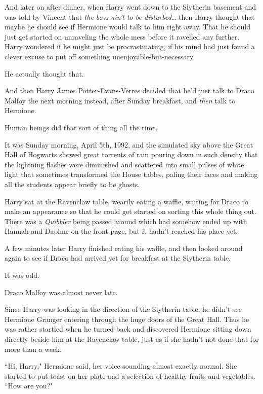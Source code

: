 And later on after dinner, when Harry went down to the Slytherin basement and was told by Vincent that \emph{the boss ain't to be disturbed{\ldots}} then Harry thought that maybe he should see if Hermione would talk to him right away. That he should just get started on unraveling the whole mess before it ravelled any further. Harry wondered if he might just be procrastinating, if his mind had just found a clever excuse to put off something unenjoyable-but-necessary.

He actually thought that.

And then Harry James Potter-Evans-Verres decided that he'd just talk to Draco Malfoy the next morning instead, after Sunday breakfast, and \emph{then} talk to Hermione.

Human beings did that sort of thing all the time.

\later

It was Sunday morning, April 5th, 1992, and the simulated sky above the Great Hall of Hogwarts showed great torrents of rain pouring down in such density that the lightning flashes were diminished and scattered into small pulses of white light that sometimes transformed the House tables, paling their faces and making all the students appear briefly to be ghosts.

Harry sat at the Ravenclaw table, wearily eating a waffle, waiting for Draco to make an appearance so that he could get started on sorting this whole thing out. There was a \emph{Quibbler} being passed around which had somehow ended up with Hannah and Daphne on the front page, but it hadn't reached his place yet.

A few minutes later Harry finished eating his waffle, and then looked around again to see if Draco had arrived yet for breakfast at the Slytherin table.

It was odd.

Draco Malfoy was almost never late.

Since Harry was looking in the direction of the Slytherin table, he didn't see Hermione Granger entering through the huge doors of the Great Hall. Thus he was rather startled when he turned back and discovered Hermione sitting down directly beside him at the Ravenclaw table, just as if she hadn't not done that for more than a week.

``Hi, Harry," Hermione said, her voice sounding almost exactly normal. She started to put toast on her plate and a selection of healthy fruits and vegetables. ``How are you?"

